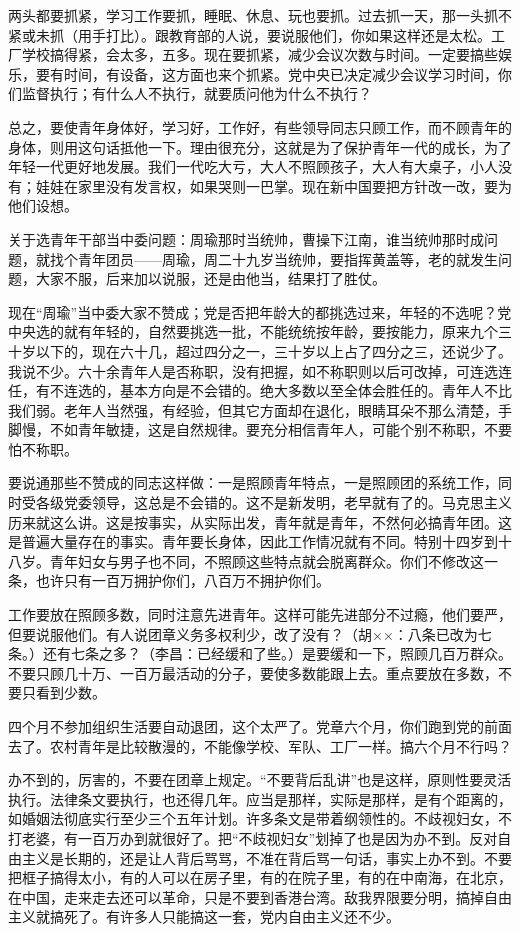 两头都要抓紧，学习工作要抓，睡眠、休息、玩也要抓。过去抓一天，那一头抓不紧或未抓（用手打比）。跟教育部的人说，要说服他们，你如果这样还是太松。工厂学校搞得紧，会太多，五多。现在要抓紧，减少会议次数与时间。一定要搞些娱乐，要有时间，有设备，这方面也来个抓紧。党中央已决定减少会议学习时间，你们监督执行；有什么人不执行，就要质问他为什么不执行？

总之，要使青年身体好，学习好，工作好，有些领导同志只顾工作，而不顾青年的身体，则用这句话抵他一下。理由很充分，这就是为了保护青年一代的成长，为了年轻一代更好地发展。我们一代吃大亏，大人不照顾孩子，大人有大桌子，小人没有；娃娃在家里没有发言权，如果哭则一巴掌。现在新中国要把方针改一改，要为他们设想。

关于选青年干部当中委问题：周瑜那时当统帅，曹操下江南，谁当统帅那时成问题，就找个青年团员——周瑜，周二十九岁当统帅，要指挥黄盖等，老的就发生问题，大家不服，后来加以说服，还是由他当，结果打了胜仗。

现在“周瑜”当中委大家不赞成；党是否把年龄大的都挑选过来，年轻的不选呢？党中央选的就有年轻的，自然要挑选一批，不能统统按年龄，要按能力，原来九个三十岁以下的，现在六十几，超过四分之一，三十岁以上占了四分之三，还说少了。我说不少。六十余青年人是否称职，没有把握，如不称职则以后可改掉，可连选连任，有不连选的，基本方向是不会错的。绝大多数以至全体会胜任的。青年人不比我们弱。老年人当然强，有经验，但其它方面却在退化，眼睛耳朵不那么清楚，手脚慢，不如青年敏捷，这是自然规律。要充分相信青年人，可能个别不称职，不要怕不称职。

要说通那些不赞成的同志这样做：一是照顾青年特点，一是照顾团的系统工作，同时受各级党委领导，这总是不会错的。这不是新发明，老早就有了的。马克思主义历来就这么讲。这是按事实，从实际出发，青年就是青年，不然何必搞青年团。这是普遍大量存在的事实。青年要长身体，因此工作情况就有不同。特别十四岁到十八岁。青年妇女与男子也不同，不照顾这些特点就会脱离群众。你们不修改这一条，也许只有一百万拥护你们，八百万不拥护你们。

工作要放在照顾多数，同时注意先进青年。这样可能先进部分不过瘾，他们要严，但要说服他们。有人说团章义务多权利少，改了没有？（胡××：八条已改为七条。）还有七条之多？（李昌：已经缓和了些。）是要缓和一下，照顾几百万群众。不要只顾几十万、一百万最活动的分子，要使多数能跟上去。重点要放在多数，不要只看到少数。

四个月不参加组织生活要自动退团，这个太严了。党章六个月，你们跑到党的前面去了。农村青年是比较散漫的，不能像学校、军队、工厂一样。搞六个月不行吗？

办不到的，厉害的，不要在团章上规定。“不要背后乱讲”也是这样，原则性要灵活执行。法律条文要执行，也还得几年。应当是那样，实际是那样，是有个距离的，如婚姻法彻底实行至少三个五年计划。许多条文是带着纲领性的。不歧视妇女，不打老婆，有一百万办到就很好了。把“不歧视妇女”划掉了也是因为办不到。反对自由主义是长期的，还是让人背后骂骂，不准在背后骂一句话，事实上办不到。不要把框子搞得太小，有的人可以在房子里，有的在院子里，有的在中南海，在北京，在中国，走来走去还可以革命，只是不要到香港台湾。敌我界限要分明，搞掉自由主义就搞死了。有许多人只能搞这一套，党内自由主义还不少。


